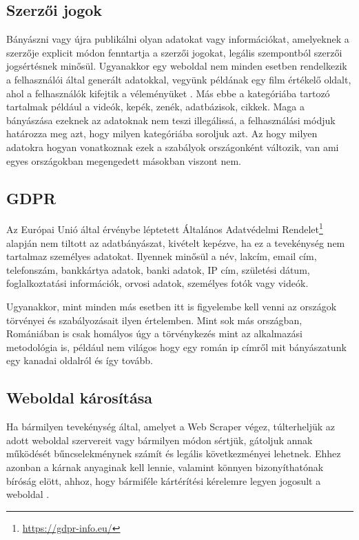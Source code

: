 \subsection{Szerzői jogok}

Bányászni vagy újra publikálni olyan adatokat vagy információkat, amelyeknek a szerzője explicit módon fenntartja a szerzői jogokat, legális szempontból szerzői jogsértésnek minősül. Ugyanakkor egy weboldal nem minden esetben rendelkezik a felhasználói által generált adatokkal, vegyünk példának egy film értékelő oldalt, ahol a felhasználók kifejtik a véleményüket \cite{krotov2018legality}. Más ebbe a kategóriába tartozó tartalmak például a videók, kepék, zenék, adatbázisok, cikkek. Maga a bányászása ezeknek az adatoknak nem teszi illegálissá, a felhasználási módjuk határozza meg azt, hogy milyen kategóriába soroljuk azt. Az hogy milyen adatokra hogyan vonatkoznak ezek a szabályok országonként változik, van ami egyes országokban megengedett másokban viszont nem.

\subsection{GDPR}

Az Európai Unió által érvénybe léptetett Általános Adatvédelmi Rendelet\footnote{\url{https://gdpr-info.eu/}} alapján nem tiltott az adatbányászat, kivételt kepézve, ha ez a tevekénység nem tartalmaz személyes adatokat. Ilyennek minősül a név, lakcím, email cím, telefonszám, bankkártya adatok, banki adatok, IP cím, születési dátum, foglalkoztatási információk, orvosi adatok, személyes fotók vagy videók.

Ugyanakkor, mint minden más esetben itt is figyelembe kell venni az országok törvényei és szabályozásait ilyen értelemben. Mint sok más országban, Romániában is csak homályos úgy a törvénykezés mint az alkalmazási metodológia is, például nem világos hogy egy román ip címről mit bányászatunk egy kanadai oldalról és így tovább. 
\subsection{Weboldal károsítása}

Ha bármilyen tevekénység által, amelyet a Web Scraper végez, túlterheljük az adott weboldal szervereit vagy bármilyen módon sértjük, gátoljuk annak működését bűncselekménynek számít és legális következményei lehetnek. Ehhez azonban a kárnak anyaginak kell lennie, valamint könnyen bizonyíthatónak bíróság elött, ahhoz, hogy bármiféle kártérítési kérelemre legyen jogosult a weboldal \cite{krotov2018legality}. 

